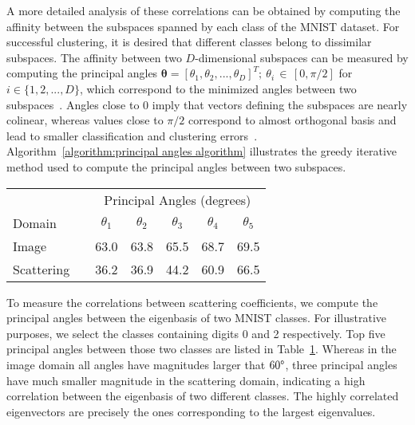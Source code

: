 \documentclass[11pt]{article}
\theoremstyle{definition}
\newcommand{\PrincipalAngles}{\boldsymbol{\theta}}
\newcommand{\PrincipalAngle}[1]{\theta_{#1}}
\newcommand{\Table}[1]{Table~\ref{#1}}
\newcommand{\Algorithm}[1]{Algorithm~\ref{#1}}
\begin{document}
A more detailed analysis of these correlations can be obtained by computing the affinity between the subspaces spanned by each class of the MNIST dataset. For successful clustering, it is desired that different classes belong to dissimilar subspaces. The affinity between two $D$-dimensional subspaces can be measured by computing the principal angles 
$\PrincipalAngles = [\PrincipalAngle{1}, \PrincipalAngle{2}, ..., \PrincipalAngle{D}]^T ; \ \PrincipalAngle{i} \, \in \, [0,\pi/2] $ for $ i \in \{1,2,...,D\}$, which correspond to the minimized angles between two subspaces~\cite{Bjorck_AnglesBetweenLinearSubspaces_1973}. Angles close to 0 imply that vectors defining the subspaces are nearly colinear, whereas values close to $\pi / 2 $ correspond to almost orthogonal basis and
lead to smaller classification and clustering errors~\cite{Huang_RoleOfPrincipalAngelsSubspaceClassification_2015}.
\Algorithm{algorithm:principal angles algorithm} illustrates the greedy iterative method used to compute the principal angles between two subspaces.



\begin{table}[tb]
	\centering
	\label{table:principal angles}
	\begin{tabular}{|lr|ccccc|}
		\hline
		&&  \multicolumn{5}{c|}{Principal Angles (degrees)}\\
		Domain && $\PrincipalAngle{1}$ & $\PrincipalAngle{2}$ & $\PrincipalAngle{3}$ & $\PrincipalAngle{4}$ & $\PrincipalAngle{5}$ \\
		\hline
		
		Image && 63.0\degree & 63.8\degree & 65.5\degree & 68.7\degree & 69.5\degree  \\
		
		Scattering && 36.2\degree & 36.9\degree & 44.2\degree & 60.9\degree & 66.5\degree  \\
		
		\hline
		
	\end{tabular}
\end{table}

To measure the correlations between scattering coefficients, we compute the principal angles between the eigenbasis of two MNIST classes. For illustrative purposes, we select the classes containing digits 0 and 2 respectively.
Top five principal angles between those two classes are listed in \Table{table:principal angles}.
Whereas in the image domain all angles have magnitudes larger that $60\degree$, three principal angles have much smaller magnitude in the scattering domain, indicating a high correlation between the eigenbasis of two different classes. The highly correlated eigenvectors are precisely the ones corresponding to the largest eigenvalues.
\end{document}
